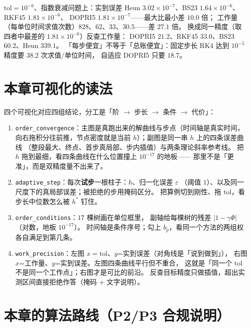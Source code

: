 \begin{corollary}[实测：$10$ 倍与 $27$ 倍]
\label{cor:spread}
$\mathrm{tol}=10^{-6}$、指数衰减问题上：实到误差
Heun $3.02\times10^{-7}$、BS23 $1.64\times10^{-6}$、RKF45 $1.81\times10^{-6}$、
DOPRI5 $1.81\times10^{-7}$——最大比最小差 $10.0$ 倍；
工作量（每单位时间求值次数）$828$、$62$、$33$、$30.5$——差 $27.1$ 倍。
换成同一精度（取四者中最差的 $1.81\times10^{-6}$）反查工作量：
DOPRI5 $21.2$、RKF45 $33.0$、BS23 $60.2$、Heun $339.1$。
「每步便宜」不等于「总账便宜」：固定步长 RK4 达到 $10^{-5}$ 精度要 $38.2$ 次求值/单位时间，
自适应 DOPRI5 只要 $18.7$。
\end{corollary}

\section{本章可视化的读法}

四个可视化对应四组结论，分工是「阶 $\to$ 步长 $\to$ 条件 $\to$ 代价」：

\begin{enumerate}
  \item \texttt{order\_\allowbreak{}convergence}：主图是真跑出来的解曲线与步点（时间轴是真实时间，
        向右拖积分往前推，节点密度就是当前 $h$）；副图是同一串 $h$ 上的四条误差曲线
        （整段最大、终点、首步真局部、步内插值）与两条理论斜率参考线。
        把 $h$ 拖到最细，看四条曲线在什么位置撞上 $10^{-17}$ 的地板——
        那里不是「更准」，而是双精度量不出来了。
  \item \texttt{adaptive\_\allowbreak{}step}：每次\textbf{试步}一根柱子：$h$、归一化误差 $\varepsilon$
        （阈值 $1$）、以及同一尺度下的真局部误差；被拒绝的步用掩码区分。
        把算例切到刚性、拖 $\mathrm{tol}$，看步长中位数怎么被 $h^\ast$ 钉住。
  \item \texttt{order\_\allowbreak{}conditions}：$17$ 棵树画在单位框里，
        副轴给每棵树的残差 $|1-\gamma\Phi|$（对数，地板 $10^{-17}$）。
        时间轴是条件序号；勾上 $b_{\hat p}$，看同一个方法的两组权各自满足到第几条。
  \item \texttt{work\_\allowbreak{}precision}：左图 $x=\mathrm{tol}$、$y$=实到误差（对角线是「说到做到」），
        右图 $x$=工作量、$y$=实到误差。左图四条曲线平行但不重合，
        这就是「同一个 $\mathrm{tol}$ 不是同一个工作点」；右图才是可比的前沿。
        反查目标精度只做插值，超出实测区间直接拒绝作答（掩码 $+$ 文字说明）。
\end{enumerate}

\section{本章的算法路线（P2/P3 合规说明）}

